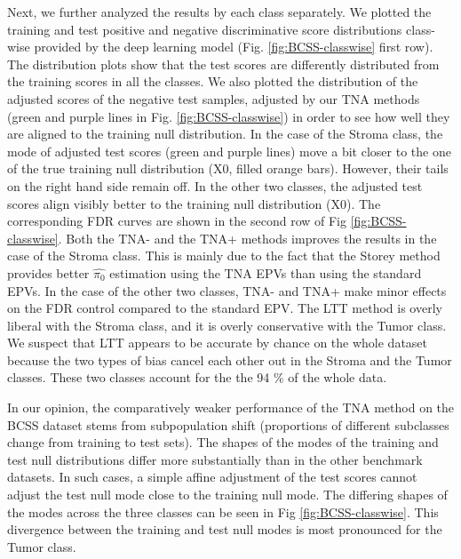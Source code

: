 \documentclass[10pt,letterpaper]{article}
\newcommand{\edit}[1]{#1} %
\begin{document}
Next, we further analyzed the results by each class separately.
We plotted the training and test positive and negative discriminative score distributions class-wise provided by the deep learning model (Fig. \ref{fig:BCSS-classwise} first row).
The distribution plots show that the test scores are differently distributed from the training scores in all the classes.
We also plotted the distribution of the adjusted scores of the negative test samples, adjusted by our TNA methods (green and purple lines in Fig. \ref{fig:BCSS-classwise}) in order to see how well they are aligned to the training null distribution.
In the case of the Stroma class, the mode of adjusted test scores (green and purple lines) move a bit closer to the one of the true training null distribution (X0, filled orange bars).
However, their tails on the right hand side remain off.
In the other two classes, the adjusted test scores align visibly better to the training null distribution (X0).
The corresponding FDR curves are shown in the second row of Fig \ref{fig:BCSS-classwise}.
Both the TNA- and the TNA+ methods improves the results in the case of the Stroma class.
This is mainly due to the fact that the Storey method provides better $\hat{\pi_0}$ estimation using the TNA EPVs than using the standard EPVs.
In the case of the other two classes, TNA- and TNA+ make minor effects on the FDR control compared to the standard EPV.
The LTT method is overly liberal with the Stroma class, and it is overly conservative with the Tumor class.
We suspect that LTT appears to be accurate by chance on the whole dataset because the two types of bias cancel each other out in the Stroma and the Tumor classes.
These two classes account for the the 94 \% of the whole data.

\edit{In our opinion, the comparatively weaker performance of the TNA method on the BCSS dataset stems from subpopulation shift (proportions of different subclasses change from training to test sets). 
The shapes of the modes of the training and test null distributions differ more substantially than in the other benchmark datasets.
In such cases, a simple affine adjustment of the test scores cannot adjust the test null mode close to the training null mode. 
The differing shapes of the modes across the three classes can be seen in Fig \ref{fig:BCSS-classwise}. 
This divergence between the training and test null modes is most pronounced for the Tumor class.}
\end{document}
